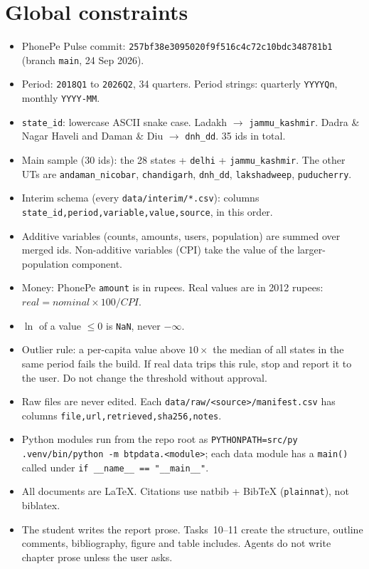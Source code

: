 \documentclass[10pt,a4paper]{article}
\newcommand{\f}[1]{\texttt{#1}}
\begin{document}
\section*{Global constraints}
\begin{itemize}
\item PhonePe Pulse commit: \f{257bf38e3095020f9f516c4c72c10bdc348781b1} (branch \f{main}, 24 Sep 2026).
\item Period: \f{2018Q1} to \f{2026Q2}, 34 quarters. Period strings: quarterly \f{YYYYQn}, monthly \f{YYYY-MM}.
\item \f{state\_id}: lowercase ASCII snake case. Ladakh $\to$ \f{jammu\_kashmir}. Dadra \& Nagar Haveli and
      Daman \& Diu $\to$ \f{dnh\_dd}. 35 ids in total.
\item Main sample (30 ids): the 28 states + \f{delhi} + \f{jammu\_kashmir}. The other UTs are
      \f{andaman\_nicobar}, \f{chandigarh}, \f{dnh\_dd}, \f{lakshadweep}, \f{puducherry}.
\item Interim schema (every \f{data/interim/*.csv}): columns \f{state\_id,period,variable,value,source}, in this order.
\item Additive variables (counts, amounts, users, population) are summed over merged ids. Non-additive variables
      (CPI) take the value of the larger-population component.
\item Money: PhonePe \f{amount} is in rupees. Real values are in 2012 rupees: $real = nominal \times 100 / CPI$.
\item $\ln$ of a value $\le 0$ is \f{NaN}, never $-\infty$.
\item Outlier rule: a per-capita value above $10\times$ the median of all states in the same period fails the build.
      If real data trips this rule, stop and report it to the user. Do not change the threshold without approval.
\item Raw files are never edited. Each \f{data/raw/<source>/manifest.csv} has columns \f{file,url,retrieved,sha256,notes}.
\item Python modules run from the repo root as \f{PYTHONPATH=src/py .venv/bin/python -m btpdata.<module>}; each
      data module has a \f{main()} called under \f{if \_\_name\_\_ == "\_\_main\_\_"}.
\item All documents are \LaTeX{}. Citations use natbib + BibTeX (\f{plainnat}), not biblatex.
\item The student writes the report prose. Tasks~10--11 create the structure, outline comments, bibliography,
      figure and table includes. Agents do not write chapter prose unless the user asks.
\end{itemize}
\end{document}
